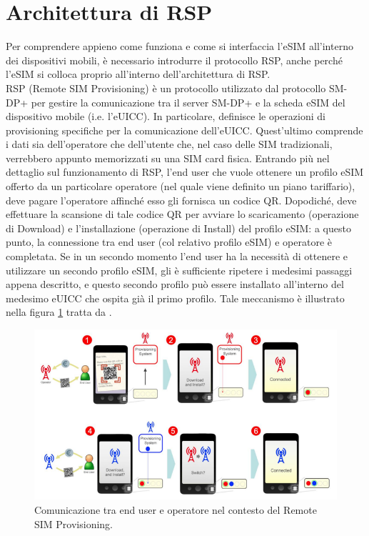 \documentclass[10pt, twoside, openany]{book}
\begin{document}
\section{Architettura di RSP}
Per comprendere appieno come funziona e come si interfaccia l'eSIM all'interno dei dispositivi mobili, è necessario introdurre il protocollo RSP, anche perché l'eSIM si colloca proprio all'interno dell'architettura di RSP.\\
RSP (Remote SIM Provisioning) è un protocollo utilizzato dal protocollo SM-DP+ per gestire la comunicazione tra il server SM-DP+ e la scheda eSIM del dispositivo mobile (i.e. l'eUICC). In particolare, definisce le operazioni di provisioning specifiche per la comunicazione dell'eUICC. Quest'ultimo comprende i dati sia dell'operatore che dell'utente che, nel caso delle SIM tradizionali, verrebbero appunto memorizzati su una SIM card fisica. Entrando più nel dettaglio sul funzionamento di RSP, l'end user che vuole ottenere un profilo eSIM offerto da un particolare operatore (nel quale viene definito un piano tariffario), deve pagare l'operatore affinché esso gli fornisca un codice QR. Dopodiché, deve effettuare la scansione di tale codice QR per avviare lo scaricamento (operazione di Download) e l'installazione (operazione di Install) del profilo eSIM: a questo punto, la connessione tra end user (col relativo profilo eSIM) e operatore è completata. Se in un secondo momento l'end user ha la necessità di ottenere e utilizzare un secondo profilo eSIM, gli è sufficiente ripetere i medesimi passaggi appena descritto, e questo secondo profilo può essere installato all'interno del medesimo eUICC che ospita già il primo profilo. Tale meccanismo è illustrato nella figura \ref{fig:RSP-functioning} tratta da \cite{GSMA-whitepaper}.
\begin{figure}
\includegraphics[width=\linewidth]{RSP-functioning.png}
\caption{Comunicazione tra end user e operatore nel contesto del Remote SIM Provisioning.}
\label{fig:RSP-functioning}
\end{figure}
\end{document}
